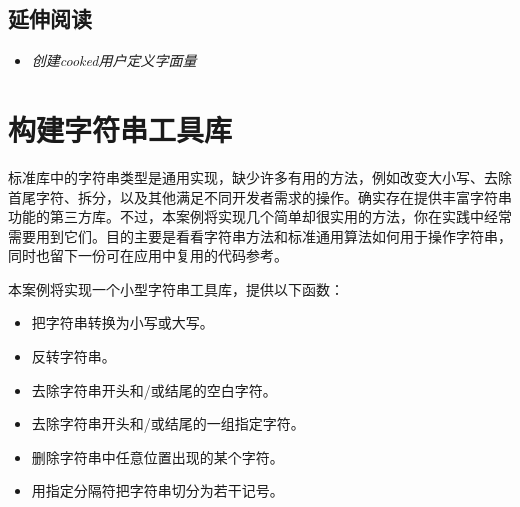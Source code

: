 
\subsection{延伸阅读}



\begin{itemize}
\item \textit{创建cooked用户定义字面量}

\end{itemize}



\section{构建字符串工具库}



标准库中的字符串类型是通用实现，缺少许多有用的方法，例如改变大小写、去除首尾字符、拆分，以及其他满足不同开发者需求的操作。确实存在提供丰富字符串功能的第三方库。不过，本案例将实现几个简单却很实用的方法，你在实践中经常需要用到它们。目的主要是看看字符串方法和标准通用算法如何用于操作字符串，同时也留下一份可在应用中复用的代码参考。



本案例将实现一个小型字符串工具库，提供以下函数：



\begin{itemize}
\item 把字符串转换为小写或大写。



\item 反转字符串。



\item 去除字符串开头和/或结尾的空白字符。



\item 去除字符串开头和/或结尾的一组指定字符。



\item 删除字符串中任意位置出现的某个字符。



\item 用指定分隔符把字符串切分为若干记号。

\end{itemize}


